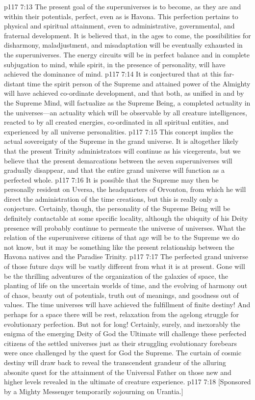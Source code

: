 \vs p117 7:13 The present goal of the superuniverses is to become, as they are and within their potentials, perfect, even as is Havona. This perfection pertains to physical and spiritual attainment, even to administrative, governmental, and fraternal development. It is believed that, in the ages to come, the possibilities for disharmony, maladjustment, and misadaptation will be eventually exhausted in the superuniverses. The energy circuits will be in perfect balance and in complete subjugation to mind, while spirit, in the presence of personality, will have achieved the dominance of mind.
\vs p117 7:14 It is conjectured that at this far\hyp{}distant time the spirit person of the Supreme and attained power of the Almighty will have achieved co\hyp{}ordinate development, and that both, as unified in and by the Supreme Mind, will factualize as the Supreme Being, a completed actuality in the universes---an actuality which will be observable by all creature intelligences, reacted to by all created energies, co\hyp{}ordinated in all spiritual entities, and experienced by all universe personalities.
\vs p117 7:15 This concept implies the actual sovereignty of the Supreme in the grand universe. It is altogether likely that the present Trinity administrators will continue as his vicegerents, but we believe that the present demarcations between the seven superuniverses will gradually disappear, and that the entire grand universe will function as a perfected whole.
\vs p117 7:16 It is possible that the Supreme may then be personally resident on Uversa, the headquarters of Orvonton, from which he will direct the administration of the time creations, but this is really only a conjecture. Certainly, though, the personality of the Supreme Being will be definitely contactable at some specific locality, although the ubiquity of his Deity presence will probably continue to permeate the universe of universes. What the relation of the superuniverse citizens of that age will be to the Supreme we do not know, but it may be something like the present relationship between the Havona natives and the Paradise Trinity.
\pc \vs p117 7:17 The perfected grand universe of those future days will be vastly different from what it is at present. Gone will be the thrilling adventures of the organization of the galaxies of space, the planting of life on the uncertain worlds of time, and the evolving of harmony out of chaos, beauty out of potentials, truth out of meanings, and goodness out of values. The time universes will have achieved the fulfillment of finite destiny! And perhaps for a space there will be rest, relaxation from the agelong struggle for evolutionary perfection. But not for long! Certainly, surely, and inexorably the enigma of the emerging Deity of God the Ultimate will challenge these perfected citizens of the settled universes just as their struggling evolutionary forebears were once challenged by the quest for God the Supreme. The curtain of cosmic destiny will draw back to reveal the transcendent grandeur of the alluring absonite quest for the attainment of the Universal Father on those new and higher levels revealed in the ultimate of creature experience.\plusone
\vsetoff
\vs p117 7:18 [Sponsored by a Mighty Messenger temporarily sojourning on Urantia.]
